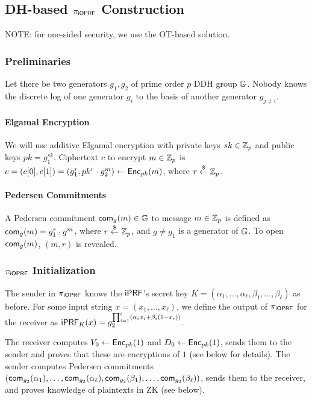 \subsection{DH-based ${\pi_{\mathsf{i}\mathsf{OPRF}}}$ Construction}
NOTE: for one-sided security, we use the OT-based solution.


\subsubsection{Preliminaries}
Let there be two generators $g_1,g_2$ of prime order $p$ DDH group
$\mathbb{G}$. Nobody knows the discrete log of one generator $g_i$ to the
basis of another generator $g_{j\neq{}i}$.

\paragraph{Elgamal Encryption}
We will use additive Elgamal encryption with private keys $sk\in\mathbb{Z}_p$
and public keys $pk=g_1^{sk}$. Ciphertext $c$ to encrypt $m\in\mathbb{Z}_p$ is
$c=(c[0],c[1])=(g_1^r,pk^r\cdot{}g_2^m)\leftarrow{\mathsf{Enc}}_{pk}(m)$, where
$r\stackrel{\$}{\leftarrow}\mathbb{Z}_p$.

\paragraph{Pedersen Commitments}
A Pedersen commitment $\mathsf{com}_{g}(m)\in\mathbb{G}$ to message $m\in\mathbb{Z}_p$ is defined as
$\mathsf{com}_{g}(m)=g_1^r\cdot{}g^m$, where $r\stackrel{\$}{\leftarrow}\mathbb{Z}_p$, and $g\neq{}g_1$ is
a generator of $\mathbb{G}$.  To open $\mathsf{com}_{g}(m)$, $(m,r)$ is revealed.


\subsubsection{${\pi_{\mathsf{i}\mathsf{OPRF}}}$ Initialization}
The sender in ${\pi_{\mathsf{i}\mathsf{OPRF}}}$ knows the $\mathsf{i}\mathsf{PRF}$'s secret key
$K=(\alpha_1,\ldots,\alpha_\ell,\beta_1,\ldots,\beta_\ell)$ as before. For some input
string $x=(x_1,\ldots{},x_\ell)$, we define the output of ${\pi_{\mathsf{i}\mathsf{OPRF}}}$ for
the receiver as
$\mathsf{i}\mathsf{PRF}_K(x)=g_2^{\prod_{i=1}^{\ell}(\alpha_ix_i+\beta_i(1-x_i))}$.

The receiver computes $V_0 \leftarrow{\mathsf{Enc}}_{pk}(1)$ and
$D_0\leftarrow{\mathsf{Enc}}_{pk}(1)$, sends them to the sender and proves that
these are encryptions of $1$ (see below for details). The sender
computes Pedersen commitments
$(\mathsf{com}_{g_2}(\alpha_1),\ldots,\mathsf{com}_{g_2}(\alpha_\ell),\mathsf{com}_{g_2}(\beta_1),\ldots,\mathsf{com}_{g_2}(\beta_\ell))$,
sends them to the receiver, and proves knowledge of plaintexts in ZK
(see below).

